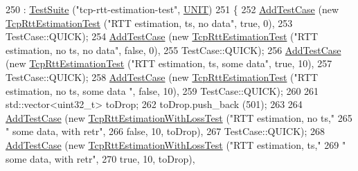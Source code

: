 \begin{DoxyCode}
250                                : \hyperlink{classns3_1_1TestSuite_a904b0c40583b744d30908aeb94636d1a}{TestSuite} (\textcolor{stringliteral}{"tcp-rtt-estimation-test"}, 
      \hyperlink{classns3_1_1TestSuite_a1ebfcab34ec8161e085e8e3a1855eae0a3885375a3787abf60431f8454b3cadbd}{UNIT})
251   \{
252     \hyperlink{classns3_1_1TestCase_a3718088e3eefd5d6454569d2e0ddd835}{AddTestCase} (\textcolor{keyword}{new} \hyperlink{classTcpRttEstimationTest}{TcpRttEstimationTest} (\textcolor{stringliteral}{"RTT estimation, ts, no data"}, \textcolor{keyword}{
      true}, 0),
253                  TestCase::QUICK);
254     \hyperlink{classns3_1_1TestCase_a3718088e3eefd5d6454569d2e0ddd835}{AddTestCase} (\textcolor{keyword}{new} \hyperlink{classTcpRttEstimationTest}{TcpRttEstimationTest} (\textcolor{stringliteral}{"RTT estimation, no ts, no data"},
       \textcolor{keyword}{false}, 0),
255                  TestCase::QUICK);
256     \hyperlink{classns3_1_1TestCase_a3718088e3eefd5d6454569d2e0ddd835}{AddTestCase} (\textcolor{keyword}{new} \hyperlink{classTcpRttEstimationTest}{TcpRttEstimationTest} (\textcolor{stringliteral}{"RTT estimation, ts, some data"}, \textcolor{keyword}{
      true}, 10),
257                  TestCase::QUICK);
258     \hyperlink{classns3_1_1TestCase_a3718088e3eefd5d6454569d2e0ddd835}{AddTestCase} (\textcolor{keyword}{new} \hyperlink{classTcpRttEstimationTest}{TcpRttEstimationTest} (\textcolor{stringliteral}{"RTT estimation, no ts, some data
      "}, \textcolor{keyword}{false}, 10),
259                  TestCase::QUICK);
260 
261     std::vector<uint32\_t> toDrop;
262     toDrop.push\_back (501);
263 
264     \hyperlink{classns3_1_1TestCase_a3718088e3eefd5d6454569d2e0ddd835}{AddTestCase} (\textcolor{keyword}{new} \hyperlink{classTcpRttEstimationWithLossTest}{TcpRttEstimationWithLossTest} (\textcolor{stringliteral}{"RTT estimation,
       no ts,"}
265                                                    \textcolor{stringliteral}{" some data, with retr"},
266                                                    \textcolor{keyword}{false}, 10, toDrop),
267                  TestCase::QUICK);
268     \hyperlink{classns3_1_1TestCase_a3718088e3eefd5d6454569d2e0ddd835}{AddTestCase} (\textcolor{keyword}{new} \hyperlink{classTcpRttEstimationWithLossTest}{TcpRttEstimationWithLossTest} (\textcolor{stringliteral}{"RTT estimation,
       ts,"}
269                                                    \textcolor{stringliteral}{" some data, with retr"},
270                                                    \textcolor{keyword}{true}, 10, toDrop),

\end{DoxyCode}
